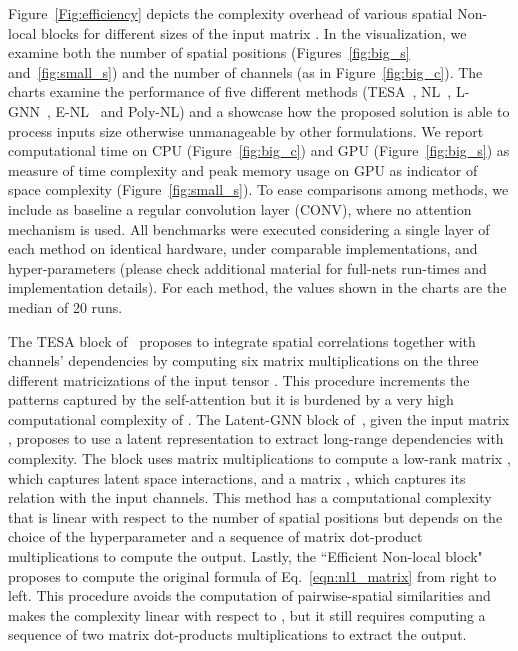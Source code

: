 \documentclass[10pt,twocolumn,letterpaper]{article}
\begin{document}
Figure~\ref{Fig:efficiency} depicts the complexity overhead of various spatial Non-local blocks for different sizes of the input matrix . In the visualization, we examine both the number of spatial positions (Figures~\ref{fig:big_s} and~\ref{fig:small_s}) and the number of channels (as in Figure~\ref{fig:big_c}). The charts examine the performance of five different methods (TESA~\cite{babiloni2020tesa}, NL~\cite{wang2018non}, L-GNN~\cite{zhang2019latentgnn}, E-NL~\cite{shen2021efficient} and Poly-NL) and a showcase how the proposed solution is able to process inputs size otherwise unmanageable by other formulations. We report computational time on CPU (Figure~\ref{fig:big_c}) and GPU (Figure~\ref{fig:big_s}) as measure of time complexity and peak memory usage on GPU as indicator of space complexity (Figure~\ref{fig:small_s}). To ease  comparisons among methods, we include as baseline a regular convolution layer (CONV), where no attention mechanism is used. All benchmarks were executed considering a single layer of each method on identical hardware, under comparable implementations, and hyper-parameters (please check additional material for full-nets run-times and implementation details). For each method, the values shown in the charts are the median of 20 runs.

The TESA block of~\cite{babiloni2020tesa} proposes to integrate spatial correlations together with channels' dependencies by computing six matrix multiplications on the three different matricizations of the input tensor . This procedure increments the patterns captured by the self-attention but it is burdened by a very high computational complexity of . The Latent-GNN block of~\cite{zhang2019latentgnn}, given the input matrix , proposes to use a latent representation  to extract long-range dependencies with  complexity. The block uses matrix multiplications to compute a low-rank matrix , which captures latent space interactions, and a matrix , which captures its relation with the input channels. This method has a computational complexity that is linear with respect to the number of spatial positions  but depends on the choice of the hyperparameter  and a sequence of matrix dot-product multiplications to compute the output. Lastly, the ``Efficient Non-local block"~\cite{shen2021efficient} proposes to compute the original formula of Eq.~\eqref{eqn:nl1_matrix} from right to left. This procedure avoids the computation of pairwise-spatial similarities and makes the complexity linear with respect to , but it still requires computing a sequence of two matrix dot-products multiplications to extract the output. 
\end{document}
